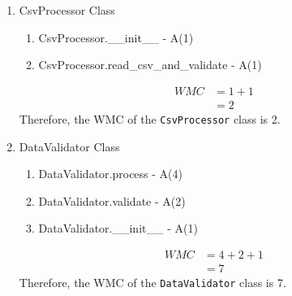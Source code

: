 \begin{enumerate}
\begin{enumerate}
    \item CsvProcessor Class\\
    \begin{enumerate}
         \item CsvProcessor.\_\_init\_\_ - A(1)
         \item CsvProcessor.read\_csv\_and\_validate - A(1)
    \end{enumerate}
    \vspace{12pt}
    
    \begin{align}
        WMC     &= 1 + 1 \\
                &= 2
    \end{align}
    Therefore, the WMC of the \texttt{CsvProcessor} class is 2.\\

    \item DataValidator Class\\
    \begin{enumerate}
        \item DataValidator.process - A(4)
        \item DataValidator.validate - A(2)
        \item DataValidator.\_\_init\_\_ - A(1)
    \end{enumerate}
    \vspace{12pt}
    
    \begin{align}
        WMC     &= 4 + 2 + 1 \\
                &= 7
    \end{align}
    Therefore, the WMC of the \texttt{DataValidator} class is 7.\\
\end{enumerate}


\end{enumerate}
